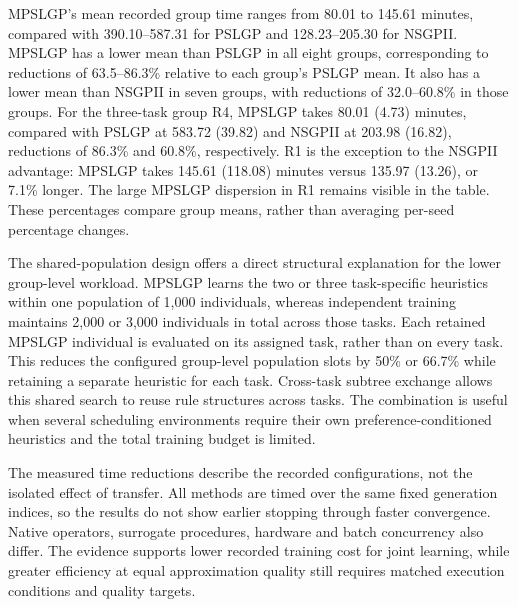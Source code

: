 MPSLGP's mean recorded group time ranges from 80.01 to 145.61 minutes, compared with 390.10--587.31 for PSLGP and 128.23--205.30 for NSGPII. MPSLGP has a lower mean than PSLGP in all eight groups, corresponding to reductions of 63.5--86.3\% relative to each group's PSLGP mean. It also has a lower mean than NSGPII in seven groups, with reductions of 32.0--60.8\% in those groups. For the three-task group R4, MPSLGP takes 80.01 (4.73) minutes, compared with PSLGP at 583.72 (39.82) and NSGPII at 203.98 (16.82), reductions of 86.3\% and 60.8\%, respectively. R1 is the exception to the NSGPII advantage: MPSLGP takes 145.61 (118.08) minutes versus 135.97 (13.26), or 7.1\% longer. The large MPSLGP dispersion in R1 remains visible in the table. These percentages compare group means, rather than averaging per-seed percentage changes.

The shared-population design offers a direct structural explanation for the lower group-level workload. MPSLGP learns the two or three task-specific heuristics within one population of 1,000 individuals, whereas independent training maintains 2,000 or 3,000 individuals in total across those tasks. Each retained MPSLGP individual is evaluated on its assigned task, rather than on every task. This reduces the configured group-level population slots by 50\% or 66.7\% while retaining a separate heuristic for each task. Cross-task subtree exchange allows this shared search to reuse rule structures across tasks. The combination is useful when several scheduling environments require their own preference-conditioned heuristics and the total training budget is limited.

The measured time reductions describe the recorded configurations, not the isolated effect of transfer. All methods are timed over the same fixed generation indices, so the results do not show earlier stopping through faster convergence. Native operators, surrogate procedures, hardware and batch concurrency also differ. The evidence supports lower recorded training cost for joint learning, while greater efficiency at equal approximation quality still requires matched execution conditions and quality targets.

\endgroup